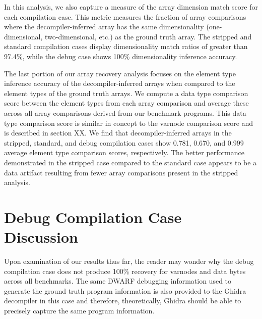 In this analysis, we also capture a measure of the array dimension match score for each compilation case. This metric measures the fraction of array comparisons where the decompiler-inferred array has the same dimensionality (one-dimensional, two-dimensional, etc.) as the ground truth array. The stripped and standard compilation cases display dimensionality match ratios of greater than 97.4\%, while the debug case shows 100\% dimensionality inference accuracy.

The last portion of our array recovery analysis focuses on the element type inference accuracy of the decompiler-inferred arrays when compared to the element types of the ground truth arrays. We compute a data type comparison score between the element types from each array comparison and average these across all array comparisons derived from our benchmark programs. This data type comparison score is similar in concept to the varnode comparison score and is described in section XX. We find that decompiler-inferred arrays in the stripped, standard, and debug compilation cases show 0.781, 0.670, and 0.999 average element type comparison scores, respectively. The better performance demonstrated in the stripped case compared to the standard case appears to be a data artifact resulting from fewer array comparisons present in the stripped analysis.

\section{Debug Compilation Case Discussion}

Upon examination of our results thus far, the reader may wonder why the debug compilation case does not produce 100\% recovery for varnodes and data bytes across all benchmarks. The same DWARF debugging information used to generate the ground truth program information is also provided to the Ghidra decompiler in this case and therefore, theoretically, Ghidra should be able to precisely capture the same program information.

